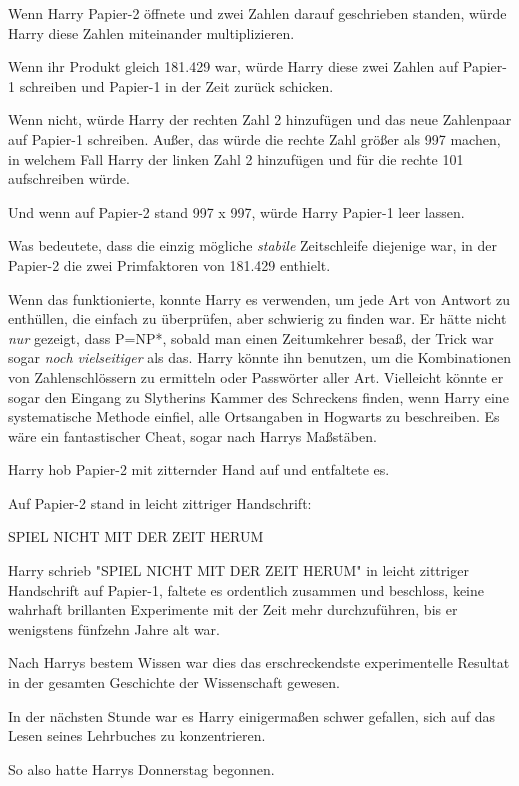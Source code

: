 {Wenn Harry Papier-2 öffnete und zwei Zahlen darauf geschrieben standen, würde Harry diese Zahlen miteinander multiplizieren.

Wenn ihr Produkt gleich 181.429 war, würde Harry diese zwei Zahlen auf Papier-1 schreiben und Papier-1 in der Zeit zurück schicken.

Wenn nicht, würde Harry der rechten Zahl 2 hinzufügen und das neue Zahlenpaar auf Papier-1 schreiben. Außer, das würde die rechte Zahl größer als 997 machen, in welchem Fall Harry der linken Zahl 2 hinzufügen und für die rechte 101 aufschreiben würde.

Und wenn auf Papier-2 stand 997 x 997, würde Harry Papier-1 leer lassen.

Was bedeutete, dass die einzig mögliche \emph{stabile} Zeitschleife diejenige war, in der Papier-2 die zwei Primfaktoren von 181.429 enthielt.

Wenn das funktionierte, konnte Harry es verwenden, um jede Art von Antwort zu enthüllen, die einfach zu überprüfen, aber schwierig zu finden war. Er hätte nicht \emph{nur} gezeigt, dass P=NP*, sobald man einen Zeitumkehrer besaß, der Trick war sogar \emph{noch vielseitiger} als das. Harry könnte ihn benutzen, um die Kombinationen von Zahlenschlössern zu ermitteln oder Passwörter aller Art. Vielleicht könnte er sogar den Eingang zu Slytherins Kammer des Schreckens finden, wenn Harry eine systematische Methode einfiel, alle Ortsangaben in Hogwarts zu beschreiben. Es wäre ein fantastischer Cheat, sogar nach Harrys Maßstäben.

Harry hob Papier-2 mit zitternder Hand auf und entfaltete es.

Auf Papier-2 stand in leicht zittriger Handschrift:

SPIEL NICHT MIT DER ZEIT HERUM

Harry schrieb "SPIEL NICHT MIT DER ZEIT HERUM" in leicht zittriger Handschrift auf Papier-1, faltete es ordentlich zusammen und beschloss, keine wahrhaft brillanten Experimente mit der Zeit mehr durchzuführen, bis er wenigstens fünfzehn Jahre alt war.

Nach Harrys bestem Wissen war dies das erschreckendste experimentelle Resultat in der gesamten Geschichte der Wissenschaft gewesen.

In der nächsten Stunde war es Harry einigermaßen schwer gefallen, sich auf das Lesen seines Lehrbuches zu konzentrieren.

So also hatte Harrys Donnerstag begonnen.

\later

}
